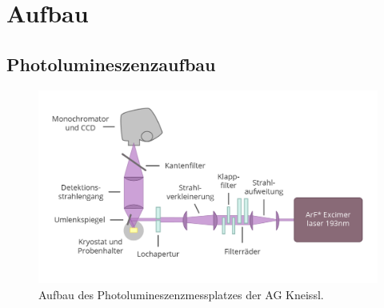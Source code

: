 
\chapter{Aufbau}


\thispagestyle{fancy}

\section{Photolumineszenzaufbau}
\begin{figure}[!htb]
    \centering
    \begin{minipage}[t]{\linewidth}
        \centering
        \includegraphics[width=0.8\linewidth]{Bilder/aufbauPL.png}
        \caption{Aufbau des Photolumineszenzmessplatzes der AG Kneissl. }
        \label{fig:wurtz}
    \end{minipage}%
\end{figure}
\vspace{1cm}
\noindent


